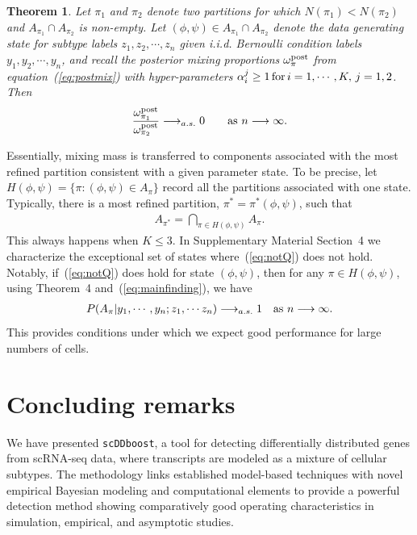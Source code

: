 \documentclass[aoas,preprint]{imsart}
\newtheorem{theorem}{Theorem}
\begin{document}
\begin{theorem}  Let $\pi_1$ and $\pi_2$ denote two partitions for which $N(\pi_1) < N(\pi_2)$
 and $A_{\pi_1} \cap A_{\pi_2}$ is non-empty. 
 Let $(\phi,\psi) \in A_{\pi_1} \cap A_{\pi_2}$ denote the data generating state for 
subtype labels $z_1, z_2, \cdots, z_n$ given i.i.d. Bernoulli condition labels $y_1, y_2, \cdots, y_n$, 
and recall the posterior mixing proportions $\omega^{\rm post}_\pi$ from equation~(\ref{eq:postmix}) with 
hyper-parameters $\alpha_i^j \geq 1 \, {\mbox {\rm for}} \,  i = 1, \cdots, K, \, j = 1,2$.   Then
\begin{eqnarray*}
\frac{\omega^{\rm post}_{\pi_1} }{ \omega^{\rm post}_{\pi_2} } \longrightarrow_{a.s.} 0 \qquad 
 {\mbox {\rm as $n \longrightarrow \infty$}}. 
\end{eqnarray*}
\end{theorem}
Essentially, mixing mass is transferred to components associated with the most refined partition
consistent with a given parameter state.  To be precise, let $H(\phi,\psi) = \{ \pi: (\phi,\psi) \in A_{\pi} \}$
record all the partitions associated with one state.   Typically, there is a most refined partition,
$\pi^* = \pi^*(\phi,\psi)$, such that
\begin{eqnarray}
\label{eq:notQ}
A_{\pi^*} = \bigcap_{\pi \in H(\phi,\psi)} A_\pi.
\end{eqnarray}
This always happens when $K \leq 3$.  In Supplementary Material Section~4 we characterize 
the exceptional set of states where~(\ref{eq:notQ}) does not hold.  Notably, if~(\ref{eq:notQ}) does hold for
state $(\phi,\psi)$, then for any $\pi \in H(\phi,\psi)$, using Theorem~4 and~(\ref{eq:mainfinding}), we have
\begin{eqnarray*}
P(A_\pi|y_1,\cdots,y_n; z_1, \cdots z_n ) \longrightarrow_{a.s.} 1 \quad {\mbox {\rm as $n \longrightarrow \infty$}}.
\end{eqnarray*}
This provides conditions under which we expect good performance for large numbers of cells.


\section{Concluding remarks}

We have presented \verb+scDDboost+,  a tool for
 detecting differentially distributed genes from scRNA-seq data,
where transcripts are modeled as a mixture of cellular subtypes. 
The methodology links established model-based
techniques with novel empirical Bayesian 
modeling and computational elements to  provide a powerful detection method showing 
comparatively good operating characteristics in simulation, empirical, and asymptotic studies.
\end{document}
